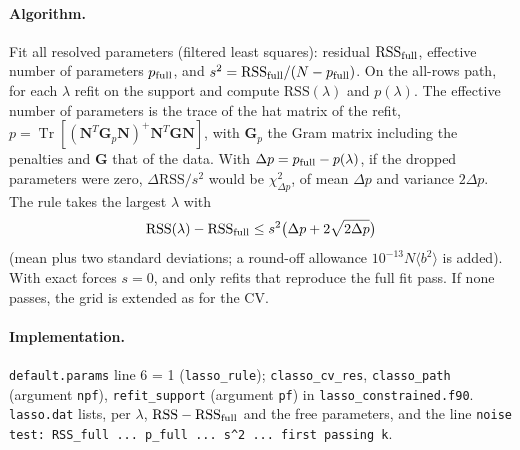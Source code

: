 \documentclass[11pt,a4paper]{article}
\newcommand{\bG}{\mathbf G}
\newcommand{\bN}{\mathbf N}
\newcommand{\code}[1]{\texttt{#1}}
\newcommand{\Tr}{\operatorname{Tr}}
\begin{document}
\paragraph{Algorithm.} Fit all resolved parameters (filtered least squares): residual $\mathrm{RSS}_{\rm full}$,
effective number of parameters $p_{\rm full}$, and $s^2=\mathrm{RSS}_{\rm full}/(N-p_{\rm full})$. On the
all-rows path, for each $\lambda$ refit on the support and compute $\mathrm{RSS}(\lambda)$ and $p(\lambda)$.
The effective number of parameters is the trace of the hat matrix of the refit,
$p=\Tr[(\bN^T\bG_p\bN)^+\bN^T\bG\bN]$, with $\bG_p$ the Gram matrix including the penalties and $\bG$ that of
the data. With $\Delta p=p_{\rm full}-p(\lambda)$, if the dropped parameters were zero, $\Delta\mathrm{RSS}/s^2$
would be $\chi^2_{\Delta p}$, of mean $\Delta p$ and variance $2\Delta p$. The rule takes the largest $\lambda$ with
\begin{equation}
\mathrm{RSS}(\lambda)-\mathrm{RSS}_{\rm full}\le s^2\big(\Delta p+2\sqrt{2\Delta p}\big)
\end{equation}
(mean plus two standard deviations; a round-off allowance $10^{-13}N\langle b^2\rangle$ is added). With exact
forces $s=0$, and only refits that reproduce the full fit pass. If none passes, the grid is extended as for
the CV.

\paragraph{Implementation.} \code{default.params} line 6 = 1 (\code{lasso\_rule}); \code{classo\_cv\_res},
\code{classo\_path} (argument \code{npf}), \code{refit\_support} (argument \code{pf}) in
\code{lasso\_constrained.f90}. \code{lasso.dat} lists, per $\lambda$, $\mathrm{RSS}-\mathrm{RSS}_{\rm full}$ and the free
parameters, and the line \code{noise test: RSS\_full ... p\_full ... s\^{}2 ... first passing k}.
\end{document}
